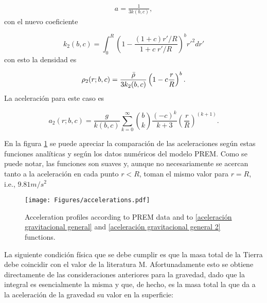 \documentclass[aps,twocolumn,showpacs,preprintnumbers]{revtex4}
\begin{document}
     \begin{align*}
        a =\frac{1}{3k(b,c)},
    \end{align*}
    con el nuevo coeficiente
    
    \begin{equation*}
        k_2(b,c) =   \int_0^R  \left(  1 - \frac{(1+c) r'/R}{1+c \; r'/R} \right)^b r'^2 dr'
    \end{equation*}
   con esto la densidad es
    
    \begin{equation}
         \rho_2(r;b,c) = \frac{\Bar{\rho}}{3k_2(b,c)} \left( 1- c\frac{r}{R}\right)^b.
         \label{densidad efectiva 2}
    \end{equation}
    La aceleración para este caso es 
    
    \begin{equation}
        a_2 (r;b,c) = \frac{g}{k(b,c)} \sum_{k=0}^{\infty} \binom{b}{k} \frac{(-c)^k}{k+3} \left(\frac{r}{R} \right)^{(k+1)}.
        \label{aceleración gravitacional general 2}
    \end{equation}
    
    En la figura \ref{fig:gravity} se puede apreciar la comparación de las aceleraciones según estas funciones analíticas y según los datos numéricos del modelo PREM. Como se puede notar, las funciones son suaves y, aunque no necesariamente se acercan tanto a la aceleración en cada punto $r<R$, toman el mismo valor para $r=R$, i.e., $9.81m/s^2$
    
    
    \begin{figure}
        \centering
        \texttt{[image: Figures/accelerations.pdf]}
        \caption{Acceleration profiles according to PREM data and to \eqref{aceleración gravitacional general} and \eqref{aceleración gravitacional general 2} functions.} 
        \label{fig:gravity}
    \end{figure}
    
    La siguiente condición física que se debe cumplir es que la masa total de la Tierra debe coincidir con el valor de la literatura M. Afortunadamente esto se obtiene directamente de las consideraciones anteriores para la gravedad, dado que la integral es esencialmente la misma y que, de hecho, es la masa total la que da a la aceleración de la gravedad su valor en la superficie: 
    
    \begin{comment}
    \begin{align*}
        \mathcal{M}(R) &= 4 \pi \int_{0}^R \rho(r') {r'}^2 dr' \\
         &= 4 \pi  \frac{\Bar{\rho}}{3k(b,c)} \sum_{k=0}^{\infty} \binom{b}{k} (-c)^k R^{-k}  \frac{r^{k+3}}{k+3} \\
         &=   \frac{4\pi}{3k(b,c)} \left(\frac{3 M}{4\pi R^3} \right) \sum_{k=0}^{\infty} \binom{b}{k} (-c)^k R^{-k}  \frac{R^{k+3}}{k+3} \\
         &= \frac{M}{3k(b,c)} \sum_{k=0}^{\infty} \binom{b}{k} (-c)^k   \frac{1}{k+3} = M.
    \end{align*}
    \end{comment}
    
\end{document}
